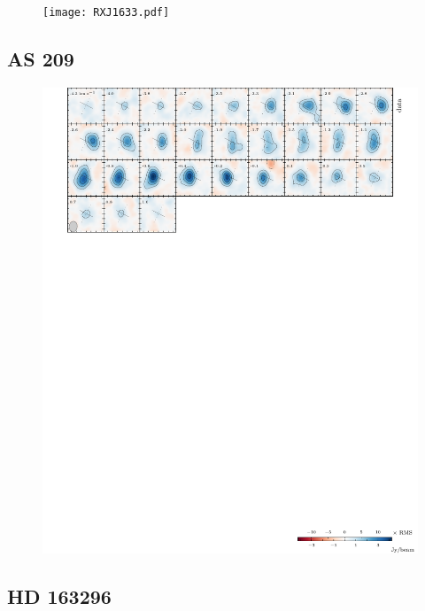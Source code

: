 \documentclass[twocolumn]{aastex6}
\begin{document}
\begin{figure}[htb]
\begin{center}
  \texttt{[image: RXJ1633.pdf]}
  \end{center}
\end{figure}

\subsection{AS 209}



\begin{figure}[htb]
\begin{center}
  \includegraphics{AS209.pdf}
  \end{center}
\end{figure}

\subsection{HD 163296}
\end{document}
